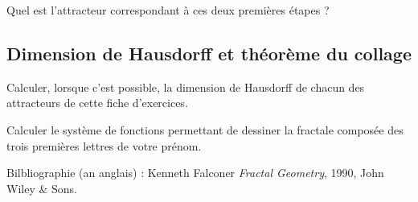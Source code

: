 \documentclass[11pt,class=report,crop=false]{standalone}
\newcommand{\commentfigure}[1]{#1} %
\begin{document}
\begin{exercicecours}[Enigme]
Quel est l'attracteur correspondant à ces deux premières étapes ?
\begin{center}
\commentfigure{
}
\end{center}

\end{exercicecours}



\subsection{Dimension de Hausdorff et théorème du collage}

\begin{exercicecours}
Calculer, lorsque c'est possible, la dimension de Hausdorff de chacun des attracteurs
de cette fiche d'exercices.
\end{exercicecours}


\begin{exercicecours}[\`A l'infini]
Calculer le système de fonctions permettant de dessiner la fractale composée des trois premières lettres
de votre prénom.
\end{exercicecours}


\bigskip
\bigskip

Bilbliographie (an anglais) : Kenneth Falconer \emph{Fractal Geometry}, 1990, John Wiley \& Sons.


\finchapitre
\end{document}
